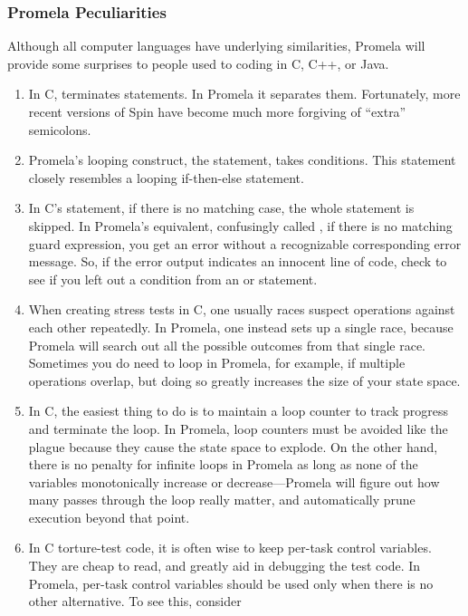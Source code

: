 \subsubsection{Promela Peculiarities}
\label{sec:formal:Promela Peculiarities}

Although all computer languages have underlying similarities,
Promela will provide some surprises to people used to coding in C,
C++, or Java.

\begin{enumerate}
\item	In C, \qco{;} terminates statements.  In Promela it separates them.
	Fortunately, more recent versions of Spin have become
	much more forgiving of ``extra'' semicolons.
\item	Promela's looping construct, the  statement, takes
	conditions.
	This  statement closely resembles a looping if-then-else
	statement.
\item	In C's  statement, if there is no matching case, the whole
	statement is skipped.  In Promela's equivalent, confusingly called
	, if there is no matching guard expression, you get an error
	without a recognizable corresponding error message.
	So, if the error output indicates an innocent line of code,
	check to see if you left out a condition from an  or 
	statement.
\item	When creating stress tests in C, one usually races suspect operations
	against each other repeatedly.	In Promela, one instead sets up
	a single race, because Promela will search out all the possible
	outcomes from that single race.	Sometimes you do need to loop
	in Promela, for example, if multiple operations overlap, but
	doing so greatly increases the size of your state space.
\item	In C, the easiest thing to do is to maintain a loop counter to track
	progress and terminate the loop.  In Promela, loop counters
	must be avoided like the plague because they cause the state
	space to explode.  On the other hand, there is no penalty for
	infinite loops in Promela as long as none of the variables
	monotonically increase or decrease---Promela will figure out
	how many passes through the loop really matter, and automatically
	prune execution beyond that point.
\item	In C torture-test code, it is often wise to keep per-task control
	variables.  They are cheap to read, and greatly aid in debugging the
	test code.  In Promela, per-task control variables should be used
	only when there is no other alternative.  To see this, consider

\end{enumerate}

